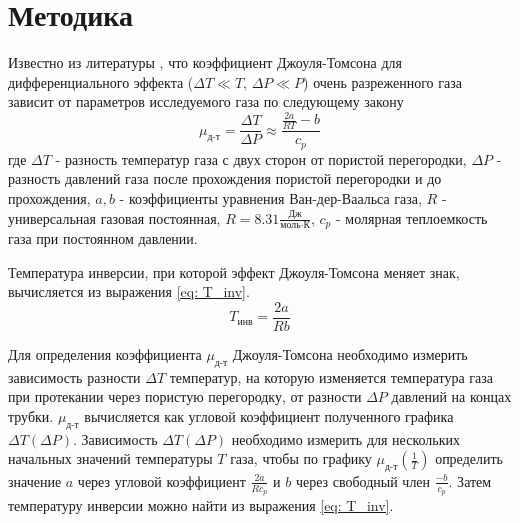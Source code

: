 \section{Методика}

Известно из литературы \cite{Sivuhin}, что коэффициент Джоуля-Томсона для дифференциального эффекта ($\Delta T \ll T$, $\Delta P \ll P$) очень разреженного газа зависит от параметров исследуемого газа по следующему закону
\begin{equation}
    \mu_\text{д-т} = \frac{\Delta T}{\Delta P} \approx \frac{\frac{2a}{RT}-b}{c_p} \label{eq: mu}
\end{equation}
где $\Delta T$ - разность температур газа с двух сторон от пористой перегородки, $\Delta P$ - разность давлений газа после прохождения пористой перегородки и до прохождения, $a, b$ - коэффициенты уравнения Ван-дер-Ваальса газа, $R$ - универсальная газовая постоянная, $R = 8.31\frac{\text{Дж}}{\text{моль}\cdot\text{К}}$, $c_p$ - молярная теплоемкость газа при постоянном давлении.  

Температура инверсии, при которой эффект Джоуля-Томсона меняет знак, вычисляется из выражения \eqref{eq: T_inv}.
\begin{equation}
    T_\text{инв} = \frac{2a}{Rb} \label{eq: T_inv}
\end{equation}

Для определения коэффициента $\mu_\text{д-т}$ Джоуля-Томсона необходимо измерить зависимость разности $\Delta T$ температур, на которую изменяется температура газа при протекании через пористую перегородку, от разности $\Delta P$ давлений на концах трубки. $\mu_\text{д-т}$ вычисляется как угловой коэффициент полученного графика $\Delta T (\Delta P)$. Зависимость $\Delta T (\Delta P)$ необходимо измерить для нескольких начальных значений температуры $T$ газа, чтобы по графику $\mu_\text{д-т}(\frac{1}{T})$ определить значение $a$ через угловой коэффициент $\frac{2a}{Rc_p}$ и $b$ через свободный член $\frac{-b}{c_p}$. Затем температуру инверсии можно найти из выражения \eqref{eq: T_inv}.